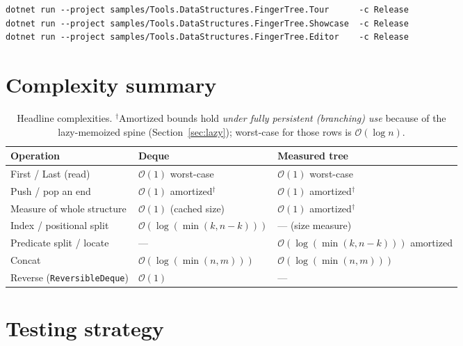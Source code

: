\documentclass[11pt]{article}
\newcommand{\cs}[1]{\lstinline|#1|}
\newcommand{\bigO}{\ensuremath{\mathcal{O}}}
\begin{document}
\begin{lstlisting}[language={}]
dotnet run --project samples/Tools.DataStructures.FingerTree.Tour      -c Release
dotnet run --project samples/Tools.DataStructures.FingerTree.Showcase  -c Release
dotnet run --project samples/Tools.DataStructures.FingerTree.Editor    -c Release
\end{lstlisting}

\clearpage
\section{Complexity summary}
\label{sec:complexitysummary}

\begin{table}[ht]
\centering
\renewcommand{\arraystretch}{1.15}
\begin{tabular}{@{}lll@{}}
\toprule
\textbf{Operation} & \textbf{Deque} & \textbf{Measured tree} \\
\midrule
First / Last (read)        & $\bigO(1)$ worst-case          & $\bigO(1)$ worst-case \\
Push / pop an end          & $\bigO(1)$ amortized$^\dagger$ & $\bigO(1)$ amortized$^\dagger$ \\
Measure of whole structure & $\bigO(1)$ (cached size)       & $\bigO(1)$ amortized$^\dagger$ \\
Index / positional split   & $\bigO(\log(\min(k,n{-}k)))$   & --- (size measure) \\
Predicate split / locate   & ---                            & $\bigO(\log(\min(k,n{-}k)))$ amortized \\
Concat                     & $\bigO(\log(\min(n,m)))$       & $\bigO(\log(\min(n,m)))$ \\
Reverse (\cs{ReversibleDeque}) & $\bigO(1)$                 & --- \\
\bottomrule
\end{tabular}
\caption{Headline complexities. $^\dagger$Amortized bounds hold \emph{under fully persistent (branching)
use} because of the lazy-memoized spine (Section~\ref{sec:lazy}); worst-case for those rows is
$\bigO(\log n)$.}
\label{tab:complexity}
\end{table}

\section{Testing strategy}
\label{sec:testing}
\end{document}
